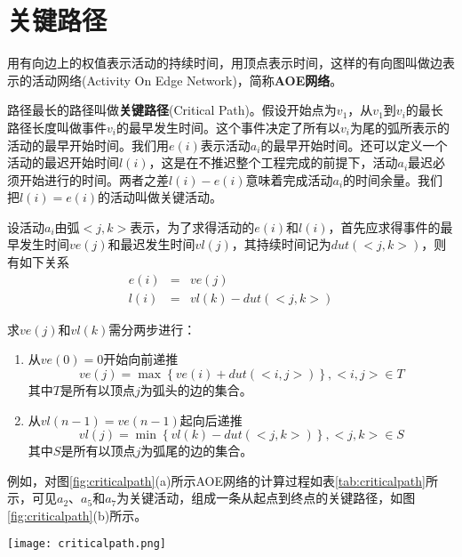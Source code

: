 \section{关键路径} %
用有向边上的权值表示活动的持续时间，用顶点表示时间，这样的有向图叫做边表示的活动网络(Activity On Edge Network)，简称\textbf{AOE网络}。

路径最长的路径叫做\textbf{关键路径}(Critical Path)。假设开始点为$v_1$，从$v_1$到$v_i$的最长路径长度叫做事件$v_i$的最早发生时间。这个事件决定了所有以$v_i$为尾的弧所表示的活动的最早开始时间。我们用$e(i)$表示活动$a_i$的最早开始时间。还可以定义一个活动的最迟开始时间$l(i)$，这是在不推迟整个工程完成的前提下，活动$a_i$最迟必须开始进行的时间。两者之差$l(i)-e(i)$意味着完成活动$a_i$的时间余量。我们把$l(i)=e(i)$的活动叫做关键活动。

设活动$a_i$由弧$<j, k>$表示，为了求得活动的$e(i)$和$l(i)$，首先应求得事件的最早发生时间$ve(j)$和最迟发生时间$vl(j)$，其持续时间记为$dut(<j, k>)$，则有如下关系
\begin{eqnarray}
e(i) &=& ve(j) \nonumber \\
l(i) &=& vl(k)-dut(<j, k>) \nonumber
\end{eqnarray}

求$ve(j)$和$vl(k)$需分两步进行：
\begin{enumerate}
\item 从$ve(0)=0$开始向前递推
$$
ve(j)=\max\left\{ve(i)+dut(<i, j>)\right\}, <i, j> \in T
$$
其中$T$是所有以顶点$j$为弧头的边的集合。
\item 从$vl(n-1)=ve(n-1)$起向后递推
$$
vl(j)=\min\left\{vl(k)-dut(<j, k>)\right\}, <j, k> \in S
$$
其中$S$是所有以顶点$j$为弧尾的边的集合。
\end{enumerate}

例如，对图\ref{fig:criticalpath}(a)所示AOE网络的计算过程如表\ref{tab:criticalpath}所示，可见$a_2$、$a_5$和$a_7$为关键活动，组成一条从起点到终点的关键路径，如图\ref{fig:criticalpath}(b)所示。

\begin{center}
\texttt{[image: criticalpath.png]}\\
\label{fig:criticalpath}
\end{center}

